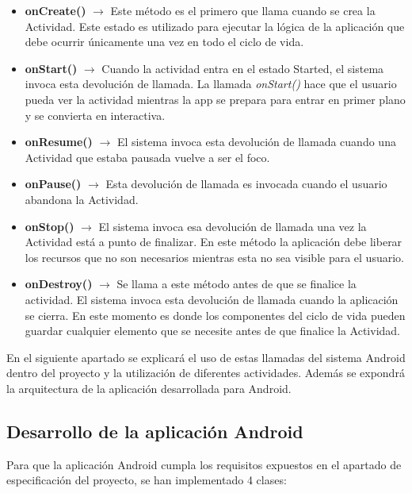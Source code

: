 \begin {itemize}
\item \textbf{onCreate()} $\rightarrow$ Este m\'etodo es el primero que llama cuando se crea la Actividad. Este estado es utilizado para ejecutar la l\'ogica de la aplicaci\'on que debe ocurrir \'unicamente una vez en todo el ciclo de vida.
\item \textbf{onStart()} $\rightarrow$ Cuando la actividad entra en el estado Started, el sistema invoca esta devoluci\'on de llamada. La llamada \textit{onStart()} hace que el usuario pueda ver la actividad mientras la app se prepara para entrar en primer plano y se convierta en interactiva.
\item \textbf{onResume()} $\rightarrow$  El sistema invoca esta devoluci\'on de llamada cuando una Actividad que estaba pausada vuelve a ser el foco.
\item \textbf{onPause()} $\rightarrow$ Esta devoluci\'on de llamada es invocada cuando el usuario abandona la Actividad. 
\item \textbf{onStop()} $\rightarrow$ El sistema invoca esa devoluci\'on de llamada una vez la Actividad est\'a a punto de finalizar. En este m\'etodo la aplicaci\'on debe liberar los recursos que no son necesarios mientras esta no sea visible para el usuario.
\item \textbf{onDestroy()} $\rightarrow$ Se llama a este m\'etodo antes de que se finalice la actividad. El sistema invoca esta devoluci\'on de llamada cuando la aplicaci\'on se cierra. En este momento es donde los componentes del ciclo de vida pueden guardar cualquier elemento que se necesite antes de que finalice la Actividad. 
\end {itemize}

En el siguiente apartado se explicar\'a el uso de estas llamadas del sistema Android dentro del proyecto y la utilizaci\'on de diferentes actividades. Adem\'as se expondr\'a la arquitectura de la aplicaci\'on desarrollada para Android.


\subsection {Desarrollo de la aplicaci\'on Android}

Para que la aplicaci\'on Android cumpla los requisitos expuestos en el apartado de especificaci\'on del proyecto, se han implementado 4 clases:


